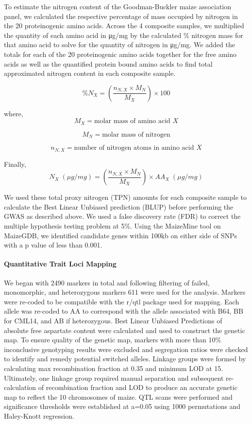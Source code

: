 \documentclass[pdflatex,sn-mathphys-num]{sn-jnl}%
\theoremstyle{thmstyleone}%
\theoremstyle{thmstyletwo}%
\theoremstyle{thmstylethree}%
\begin{document}
To estimate the nitrogen content of the Goodman-Buckler maize association panel, we calculated the respective percentage of mass occupied by nitrogen in the 20 proteinogenic amino acids. Across the 4 composite samples, we multiplied the quantity of each amino acid in μg/mg by the calculated \% nitrogen mass for that amino acid to solve for the  quantity of nitrogen in μg/mg. We added the totals for each of the 20 proteinogenic amino acids together for the free amino acids as well as the quantified protein bound amino acids to find total approximated nitrogen content in each composite sample. 

\[
\%N_X =
\left(
\frac{n_{N,X}\times M_N}{M_X}
\right)\times 100
\]

where,
\[
M_X = \text{molar mass of amino acid } X
\]

\[
M_N = \text{molar mass of nitrogen}
\]

\[
n_{N,X} = \text{number of nitrogen atoms in amino acid } X
\]

Finally,
\[
N_X\;(\mu g/mg) =
\left(
\frac{n_{N,X}\times M_N}{M_X}
\right)
\times AA_X\;(\mu g/mg)
\]



We used these total proxy nitrogen (TPN) amounts for each composite sample to calculate the Best Linear Unbiased prediction (BLUP) before performing the GWAS as described above. We used a false discovery rate (FDR) to correct the multiple hypothesis testing problem at 5\%. Using the MaizeMine tool on MaizeGDB, we identified candidate genes within 100kb on either side of SNPs with a p value of less than 0.001. 

\paragraph{Quantitative Trait Loci Mapping}
We began with 2490 markers in total and following filtering of failed, monomorphic, and heterozygous markers 611 were used for the analysis. Markers were re-coded to be compatible with the r/qtl package used for mapping. Each allele was re-coded to AA to correspond with the allele associated with B64, BB for CML14, and AB if heterozygous. Best Linear Unbiased Predictions of absolute free aspartate content were calculated and used to construct the genetic map. To ensure quality of the genetic map, markers with more than 10\% inconclusive genotyping results were excluded and segregation ratios were checked to identify and remedy potential switched alleles. Linkage groups were formed by calculating max recombination fraction at 0.35 and minimum LOD at 15. Ultimately, one linkage group required manual separation and subsequent re-calculation of recombination fraction and LOD to produce an accurate genetic map to reflect the 10 chromosomes of maize. QTL scans were performed and significance thresholds were established at a=0.05 using 1000 permutations and Haley-Knott regression.
\end{document}
